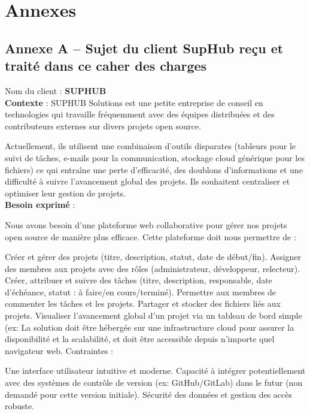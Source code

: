 \chapter*{Annexes}

\section*{Annexe A – Sujet du client SupHub reçu et traité dans ce caher des charges}

Nom du client : \textbf{SUPHUB} \\

\textbf{Contexte} : SUPHUB Solutions est une petite entreprise de conseil en technologies qui travaille fréquemment avec des équipes distribuées et des contributeurs externes sur divers projets open source. 

Actuellement, ils utilisent une combinaison d'outils disparates (tableurs pour le suivi de tâches, e-mails pour la communication, stockage cloud générique pour les fichiers) ce qui entraîne une perte d'efficacité, des doublons d'informations et une difficulté à suivre l'avancement global des projets. Ils souhaitent centraliser et optimiser leur gestion de projets. \\

\textbf{Besoin exprimé} : 

Nous avons besoin d'une plateforme web collaborative pour gérer nos projets open source de manière plus efficace. Cette plateforme doit nous permettre de :

Créer et gérer des projets (titre, description, statut, date de début/fin).
Assigner des membres aux projets avec des rôles (administrateur, développeur, relecteur).
Créer, attribuer et suivre des tâches (titre, description, responsable, date d'échéance, statut : à faire/en cours/terminé).
Permettre aux membres de commenter les tâches et les projets.
Partager et stocker des fichiers liés aux projets.
Visualiser l'avancement global d'un projet via un tableau de bord simple (ex: %
La solution doit être hébergée sur une infrastructure cloud pour assurer la disponibilité et la scalabilité, et doit être accessible depuis n'importe quel navigateur web.
Contraintes :

Une interface utilisateur intuitive et moderne.
Capacité à intégrer potentiellement avec des systèmes de contrôle de version (ex: GitHub/GitLab) dans le futur (non demandé pour cette version initiale).
Sécurité des données et gestion des accès robuste.